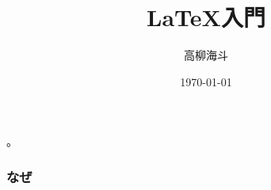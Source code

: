 \documentclass[dvipdfmx]{beamer}                 %
\title{\LaTeX 入門}
\author{高柳海斗}
\institute[名大数理B3]{名古屋大学理学部数理学科 B3}
\date{\today}
\begin{document}
\begin{frame}
  \titlepage
\end{frame}

\section{}
\subsection{}

\begin{frame}
  \frametitle{}
  。
\end{frame}

\begin{frame}
  \frametitle{}
\end{frame}

\begin{frame}
  \frametitle{なぜ}
\end{frame}
\end{document}
